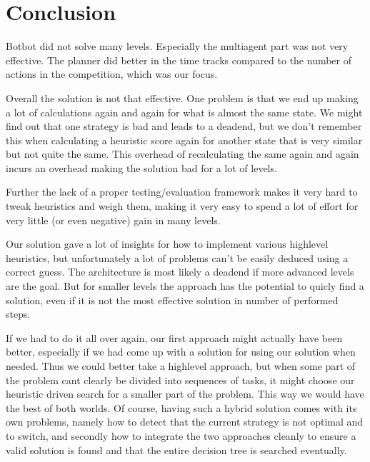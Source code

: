 \documentclass[letterpaper]{article}
\begin{document}
\section{Conclusion}
Botbot did not solve many levels. Especially the multiagent part was not
very effective. The planner did better in the time tracks compared
to the number of actions in the competition, which was our focus.

Overall the solution is not that effective. One problem is that we end up making
a lot of calculations again and again for what is almost the same state. We
might find out that one strategy is bad and leads to a deadend, but we don't
remember this when calculating a heuristic score again for another state that is
very similar but not quite the same. This overhead of recalculating the same
again and again incurs an overhead making the solution bad for a lot of levels.

Further the lack of a proper testing/evaluation framework makes it very hard to
tweak heuristics and weigh them, making it very easy to spend a lot of effort
for very little (or even negative) gain in many levels.

Our solution gave a lot of insights for how to implement various highlevel
heuristics, but unfortunately a lot of problems can't be easily deduced using a
correct guess. The architecture is most likely a deadend if more advanced levels
are the goal. But for smaller levels the approach has the potential to quicly
find a solution, even if it is not the most effective solution in number of
performed steps.

If we had to do it all over again, our first approach might actually have been
better, especially if we had come up with a solution for using our solution when
needed. Thus we could better take a highlevel approach, but when some part of
the problem cant clearly be divided into sequences of tasks, it might choose our
heuristic driven search for a smaller part of the problem. This way we would
have the best of both worlds. Of course, having such a hybrid solution comes
with its own problems, namely how to detect that the current strategy is not
optimal and to switch, and secondly how to integrate the two approaches cleanly
to ensure a valid solution is found and that the entire decision tree is searched eventually.




\end{document}
